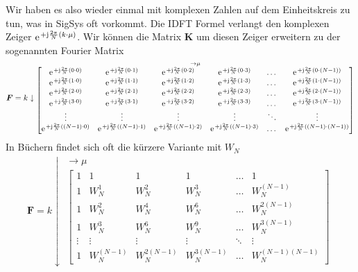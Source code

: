 Wir haben es also wieder einmal mit komplexen Zahlen auf dem Einheitskreis zu
tun, was in SigSys oft vorkommt.
%
Die IDFT Formel verlangt den komplexen Zeiger $\e^{+\im\frac{2\pi}{N} (k\cdot \mu)}$.
Wir können die Matrix $\bm{K}$ um diesen Zeiger erweitern zu der sogenannten
Fourier Matrix
\begin{align}
\bm{F} =
k \downarrow
\substack{\rightarrow \mu\\
\begin{bmatrix}
\e^{+\im\frac{2\pi}{N} (0 \cdot 0)} & \e^{+\im\frac{2\pi}{N} (0 \cdot 1)} & \e^{+\im\frac{2\pi}{N} (0 \cdot 2)} & \e^{+\im\frac{2\pi}{N} (0 \cdot 3)} & \dots & \e^{+\im\frac{2\pi}{N} (0 \cdot (N-1))}\\
\e^{+\im\frac{2\pi}{N} (1 \cdot 0)} & \e^{+\im\frac{2\pi}{N} (1 \cdot 1)} & \e^{+\im\frac{2\pi}{N} (1 \cdot 2)} & \e^{+\im\frac{2\pi}{N} (1 \cdot 3)} & \dots & \e^{+\im\frac{2\pi}{N} (1 \cdot (N-1))} \\
\e^{+\im\frac{2\pi}{N} (2 \cdot 0)} & \e^{+\im\frac{2\pi}{N} (2 \cdot 1)} & \e^{+\im\frac{2\pi}{N} (2 \cdot 2)} & \e^{+\im\frac{2\pi}{N} (2 \cdot 3)} & \dots & \e^{+\im\frac{2\pi}{N} (2 \cdot (N-1))}\\
\e^{+\im\frac{2\pi}{N} (3 \cdot 0)} & \e^{+\im\frac{2\pi}{N} (3 \cdot 1)} & \e^{+\im\frac{2\pi}{N} (3 \cdot 2)} & \e^{+\im\frac{2\pi}{N} (3 \cdot 3)} & \dots & \e^{+\im\frac{2\pi}{N} (3 \cdot (N-1))}\\
\vdots & \vdots & \vdots & \vdots & \ddots & \vdots\\
\e^{+\im\frac{2\pi}{N} ((N-1) \cdot 0)} & \e^{+\im\frac{2\pi}{N} ((N-1) \cdot 1)} & \e^{+\im\frac{2\pi}{N} ((N-1) \cdot 2)} & \e^{+\im\frac{2\pi}{N} ((N-1) \cdot 3)} & \dots &  \e^{+\im\frac{2\pi}{N} ((N-1) \cdot (N-1))}
\end{bmatrix}
}
\end{align}
In Büchern findet sich oft die kürzere Variante mit $W_N$
\begin{align}
\bm{F} =
k \downarrow
\substack{\rightarrow \mu\\
\begin{bmatrix}
1 & 1 & 1 & 1 & \dots & 1\\[1em]
1 & W_N^1 & W_N^2 & W_N^3 & \dots & W_N^{(N-1)}\\[1em]
1 & W_N^2 & W_N^4 & W_N^6 & \dots & W_N^{2(N-1)}\\[1em]
1 & W_N^3 & W_N^6 & W_N^9 & \dots & W_N^{3(N-1)}\\[1em]
\vdots & \vdots & \vdots &\vdots &\ddots & \vdots\\[1em]
1 & W_N^{(N-1)} & W_N^{2(N-1)} & W_N^{3(N-1)} & \dots & W_N^{(N-1)(N-1)}
\end{bmatrix}
}
\end{align}
